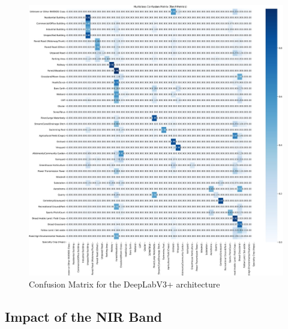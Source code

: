 \documentclass{report}
\begin{document}
\newpage
\begin{figure}[H]
    \vspace*{-4cm} %
    \hspace*{-4cm} %
    \includegraphics[width=1.7\textwidth]{own_images/low_res_confusion_matrix_DeeplabV3_efficienet_b3_20250622_132643.jpg}
    \caption{Confusion Matrix for the DeepLabV3+ architecture}
    \label{fig:con_mat_deeplab}
\end{figure}

\subsection{Impact of the NIR Band}
\end{document}
